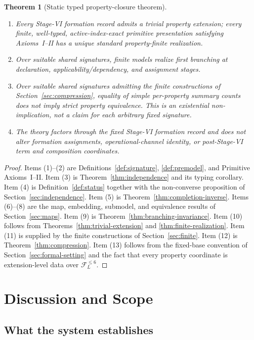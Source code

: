 \documentclass[11pt]{article}
\newcommand{\FVI}{\mathcal F_{L}^{\le 6}}
\newtheorem{theorem}{Theorem}[section]
\theoremstyle{definition}
\theoremstyle{remark}
\begin{document}
\begin{theorem}[Static typed property-closure theorem]
\begin{enumerate}[label=(\arabic*)]
\item Every Stage-VI formation record admits a trivial property extension; every finite, well-typed, active-index-exact primitive presentation satisfying Axioms~I--II has a unique standard property-finite realization.
\item Over suitable shared signatures, finite models realize first branching at declaration, applicability/dependency, and assignment stages.
\item Over suitable shared signatures admitting the finite constructions of Section~\ref{sec:compression}, equality of simple per-property summary counts does not imply strict property equivalence. This is an existential non-implication, not a claim for each arbitrary fixed signature.
\item The theory factors through the fixed Stage-VI formation record and does not alter formation assignments, operational-channel identity, or post-Stage-VI term and composition coordinates.
\end{enumerate}
\end{theorem}

\begin{proof}
Items (1)--(2) are Definitions~\ref{def:signature}, \ref{def:premodel}, and Primitive Axioms~I--II.
Item (3) is Theorem~\ref{thm:independence} and its typing corollary.
Item (4) is Definition~\ref{def:status} together with the non-converse proposition of Section~\ref{sec:independence}.
Item (5) is Theorem~\ref{thm:completion-inverse}.
Items (6)--(8) are the map, embedding, submodel, and equivalence results of Section~\ref{sec:maps}.
Item (9) is Theorem~\ref{thm:branching-invariance}.
Item (10) follows from Theorems~\ref{thm:trivial-extension} and \ref{thm:finite-realization}.
Item (11) is supplied by the finite constructions of Section~\ref{sec:finite}.
Item (12) is Theorem~\ref{thm:compression}.
Item (13) follows from the fixed-base convention of Section~\ref{sec:formal-setting} and the fact that every property coordinate is extension-level data over \(\FVI\).
\end{proof}

\section{Discussion and Scope}
\label{sec:discussion}

\subsection{What the system establishes}
\end{document}
